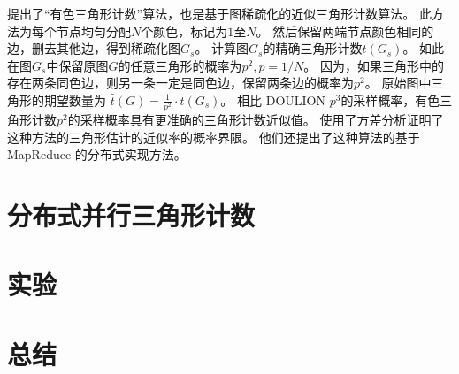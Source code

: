 \cite{pagh2012colorful}提出了``有色三角形计数''算法，也是基于图稀疏化的近似三角形计数算法。
此方法为每个节点均匀分配$N$个颜色，标记为$1$至$N$。
然后保留两端节点颜色相同的边，删去其他边，得到稀疏化图$G_s$。
计算图$G_s$的精确三角形计数$t(G_s)$。
如此在图$G_s$中保留原图$G$的任意三角形的概率为$p^2,p=1/N$。
因为，如果三角形中的存在两条同色边，则另一条一定是同色边，保留两条边的概率为$p^2$。
原始图中三角形的期望数量为
$\hat{t}(G)=\frac{1}{p^2}\cdot t(G_s) $。
相比 DOULION $p^3$的采样概率，有色三角形计数$p^2$的采样概率具有更准确的三角形计数近似值。
\cite{pagh2012colorful}使用了方差分析证明了这种方法的三角形估计的近似率的概率界限。
他们还提出了这种算法的基于 MapReduce 的分布式实现方法。

\section{分布式并行三角形计数}

\section{实验}

\section{总结}